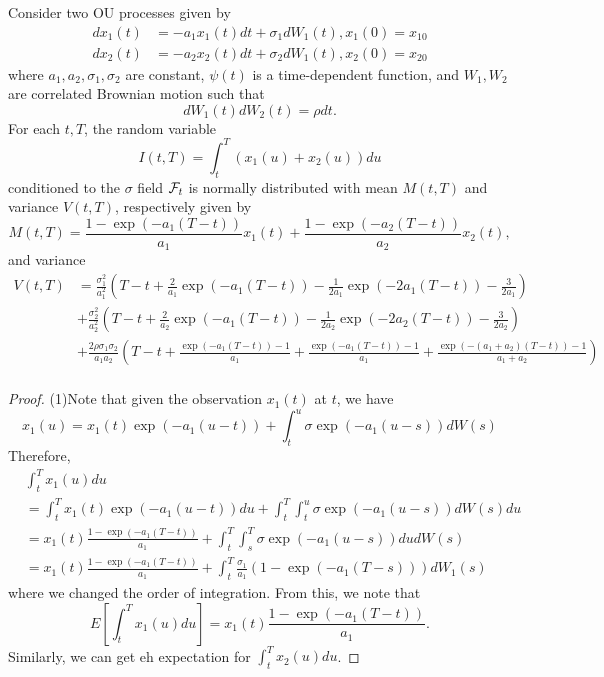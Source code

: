 \begin{refsection}
\begin{lemma}\cite[145]{brigo2007interest}\cite[64]{mcinerney2015stochastic}\label{ch:theory-of-stochastic-process:th:IntegralOfSumOfTwoOUProcesses}
	Consider two OU processes given by
	\begin{align*}
	dx_1(t) &= -a_1 x_1(t)dt + \sigma_1 dW_1(t), x_1(0) = x_{10}\\
	dx_2(t) &= -a_2 x_2(t)dt + \sigma_2 dW_1(t), x_2(0) = x_{20}
	\end{align*} 
	where $a_1,a_2, \sigma_1,\sigma_2$ are constant, $\psi(t)$ is a time-dependent function, and $W_1, W_2$ are correlated Brownian motion such that
	$$dW_1(t)dW_2(t) = \rho dt.$$	
	For each $t,T$, the random variable
	$$I(t,T) = \int_t^T (x_1(u) + x_2(u)) du$$
	conditioned to the $\sigma$ field $\mathcal{F}_t$ is normally distributed with mean $M(t,T)$ and variance $V(t,T)$, respectively given by
	$$M(t,T) = \frac{1-\exp(-a_1(T-t))}{a_1} x_1(t) + \frac{1-\exp(-a_2(T-t))}{a_2} x_2(t),$$
	and variance 
	\begin{align*}
	V(t,T) &= \frac{\sigma_1^2}{a_1^2}(T-t + \frac{2}{a_1}\exp(-a_1(T-t))-\frac{1}{2a_1}\exp(-2a_1(T-t))-\frac{3}{2a_1} ) \\
	&+ \frac{\sigma_2^2}{a_2^2}(T-t + \frac{2}{a_2}\exp(-a_1(T-t))-\frac{1}{2a_2}\exp(-2a_2(T-t))-\frac{3}{2a_2} ) \\
	&+ \frac{2\rho\sigma_1\sigma_2}{a_1a_2}(T-t +\frac{\exp(-a_1(T-t))-1}{a_1}+\frac{\exp(-a_1(T-t))-1}{a_1}+\frac{\exp(-(a_1+a_2)(T-t))-1}{a_1+a_2}) \\
	\end{align*}
\end{lemma}
\begin{proof}
	(1)Note that given the observation $x_1(t)$ at $t$, we have
	$$x_1(u) = x_1(t)\exp(-a_1(u-t)) + \int_t^u \sigma \exp(-a_1(u-s))dW(s)$$	
	Therefore,
	\begin{align*}
	&\int_t^T x_1(u) du \\
	&=\int_t^T x_1(t)\exp(-a_1(u-t))du + \int_t^T\int_t^u \sigma \exp(-a_1(u-s))dW(s)du\\
	&=x_1(t)\frac{1-\exp(-a_1(T-t))}{a_1} + \int_t^T\int_s^T \sigma \exp(-a_1(u-s))dudW(s)\\
	&=x_1(t)\frac{1-\exp(-a_1(T-t))}{a_1} + \int_t^T\frac{\sigma_1}{a_1}(1-\exp(-a_1(T-s)))dW_1(s)
	\end{align*}
	where we changed the order of integration.
	From this, we note that
	$$E[\int_t^T x_1(u) du] = x_1(t)\frac{1-\exp(-a_1(T-t))}{a_1}.$$
	Similarly, we can get eh expectation for $\int_t^Tx_2(u)du$.
	

\end{proof}
\end{refsection}
